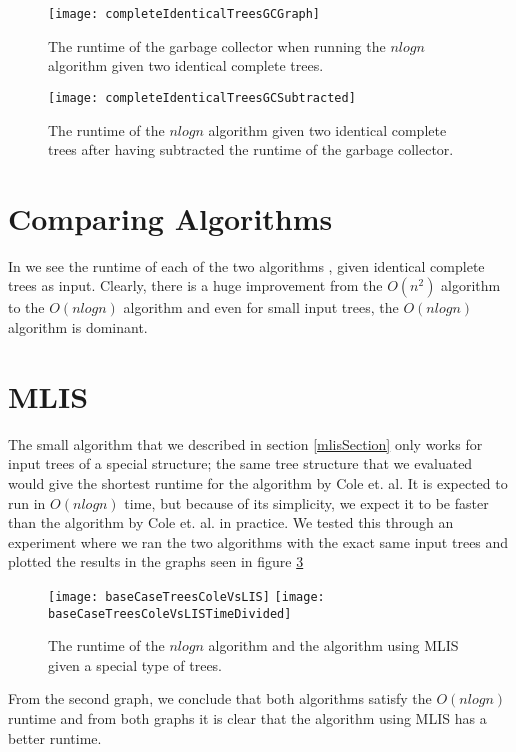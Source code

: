 \begin{figure}
	\texttt{[image: completeIdenticalTreesGCGraph]}
	\caption{The runtime of the garbage collector when running the $nlogn$ algorithm given two identical complete trees.}
	\label{completeIdenticalTreesGCGraph}
\end{figure}
\begin{figure}
	\texttt{[image: completeIdenticalTreesGCSubtracted]}
	\caption{The runtime of the $nlogn$ algorithm given two identical complete trees after having subtracted the runtime of the garbage collector.}
	\label{completeIdenticalTreesGCSubtractedGraph}
\end{figure}

\section{Comparing Algorithms}
In  we see the runtime of each of the two algorithms , given identical complete trees as input. Clearly, there is a huge improvement from the $O(n^2)$ algorithm to the $O(nlogn)$ algorithm and even for small input trees, the $O(nlogn)$ algorithm is dominant.


\section{MLIS}
The small algorithm that we described in section \ref{mlisSection} only works for input trees of a special structure; the same tree structure that we evaluated would give the shortest runtime for the algorithm by Cole et. al. It is expected to run in $O(nlogn)$ time, but because of its simplicity, we expect it to be faster than the algorithm by Cole et. al. in practice. We tested this through an experiment where we ran the two algorithms with the exact same input trees and plotted the results in the graphs seen in figure \ref{baseCaseTreesColeVsLIS}

\begin{figure}
	\texttt{[image: baseCaseTreesColeVsLIS]}
	\texttt{[image: baseCaseTreesColeVsLISTimeDivided]}
	\caption{The runtime of the $nlogn$ algorithm and the algorithm using MLIS given a special type of trees.}
	\label{baseCaseTreesColeVsLIS}
\end{figure}

From the second graph, we conclude that both algorithms satisfy the $O(nlogn)$ runtime and from both graphs it is clear that the algorithm using MLIS has a better runtime.



